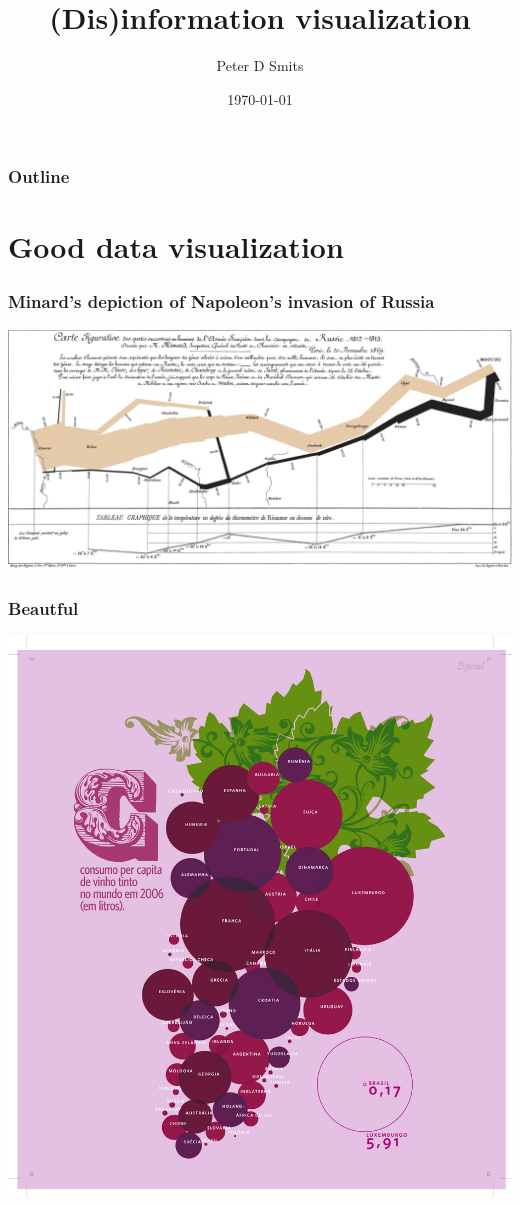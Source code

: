\documentclass{beamer}
\title{(Dis)information visualization}
\author{Peter D Smits}
\institute{Committee on Evolutionary Biology \\
University of Chicago}
\date{\today}
\begin{document}
\begin{frame}
  \maketitle
\end{frame}

\begin{frame}
  \frametitle{Outline}
  \tableofcontents
\end{frame}

\section{Good data visualization}
\begin{frame}
  \frametitle{Minard's depiction of Napoleon's invasion of Russia}
  \includegraphics[width = \textwidth, keepaspectratio = true]{figure/minard}
\end{frame}

\begin{frame}
  \frametitle{Beautful}
  \begin{center}
    \includegraphics[height = 0.9\textheight, keepaspectratio = true]{figure/wine_consumption_2006}
  \end{center}
\end{frame}
\end{document}

